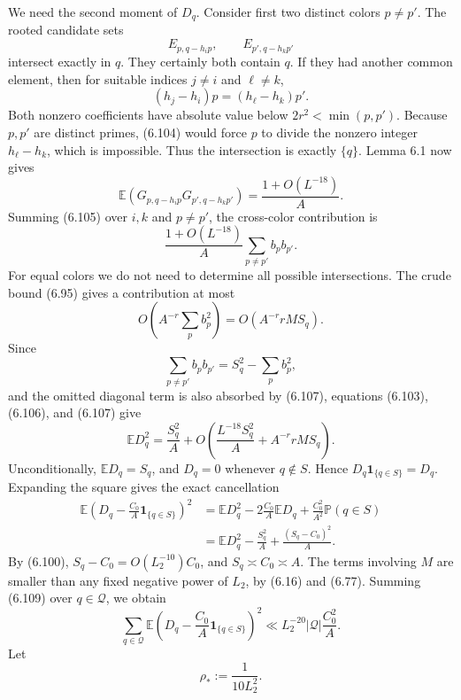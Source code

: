 \documentclass[10pt,letterpaper]{article}
\newcommand{\PP}{\mathbb{P}}
\newcommand{\EE}{\mathbb{E}}
\newcommand{\QQ}{\mathcal{Q}}
\newcommand{\ind}{\mathbf{1}}
\begin{document}
We need the second moment of $D_q$. Consider first two distinct colors $p\ne p'$. The rooted candidate sets
\[
E_{p,q-h_ip},\qquad E_{p',q-h_kp'}
\]
intersect exactly in $q$. They certainly both contain $q$. If they had another common element, then for suitable
indices $j\ne i$ and $\ell\ne k$,
\begin{equation}
(h_j-h_i)p=(h_\ell-h_k)p'.
\tag{6.104}
\end{equation}
Both nonzero coefficients have absolute value below $2r^2<\min(p,p')$. Because $p,p'$ are distinct primes, (6.104)
would force $p$ to divide the nonzero integer $h_\ell-h_k$, which is impossible. Thus the intersection is exactly $\{q\}$.
Lemma 6.1 now gives
\begin{equation}
\EE(G_{p,q-h_ip}G_{p',q-h_kp'})=\frac{1+O(L^{-18})}{A}.
\tag{6.105}
\end{equation}
Summing (6.105) over $i,k$ and $p\ne p'$, the cross-color contribution is
\begin{equation}
\frac{1+O(L^{-18})}{A}\sum_{p\ne p'}b_pb_{p'}.
\tag{6.106}
\end{equation}
For equal colors we do not need to determine all possible intersections. The crude bound (6.95) gives a
contribution at most
\begin{equation}
O\left(A^{-r}\sum_pb_p^2\right)=O(A^{-r}rMS_q).
\tag{6.107}
\end{equation}
Since
\[
\sum_{p\ne p'}b_pb_{p'}=S_q^2-\sum_pb_p^2,
\]
and the omitted diagonal term is also absorbed by (6.107), equations (6.103), (6.106), and (6.107) give
\begin{equation}
\EE D_q^2=\frac{S_q^2}{A}
+O\left(\frac{L^{-18}S_q^2}{A}+A^{-r}rMS_q\right).
\tag{6.108}
\end{equation}
Unconditionally, $\EE D_q=S_q$, and $D_q=0$ whenever $q\notin S$. Hence $D_q\ind_{\{q\in S\}}=D_q$. Expanding the square gives
the exact cancellation
\begin{equation}
\begin{aligned}
\EE\left(D_q-\frac{C_0}{A}\ind_{\{q\in S\}}\right)^2
&=\EE D_q^2-2\frac{C_0}{A}\EE D_q+\frac{C_0^2}{A^2}\PP(q\in S)\\
&=\EE D_q^2-\frac{S_q^2}{A}+\frac{(S_q-C_0)^2}{A}.
\end{aligned}
\tag{6.109}
\end{equation}
By (6.100), $S_q-C_0=O(L_2^{-10})C_0$, and $S_q\asymp C_0\asymp A$. The terms involving $M$ are smaller than any fixed
negative power of $L_2$, by (6.16) and (6.77). Summing (6.109) over $q\in\QQ$, we obtain
\begin{equation}
\sum_{q\in\QQ}\EE\left(D_q-\frac{C_0}{A}\ind_{\{q\in S\}}\right)^2
\ll L_2^{-20}|\QQ|\frac{C_0^2}{A}.
\tag{6.110}
\end{equation}
Let
\begin{equation}
\rho_*:=\frac1{10L_2^2}.
\tag{6.111}
\end{equation}
\end{document}
